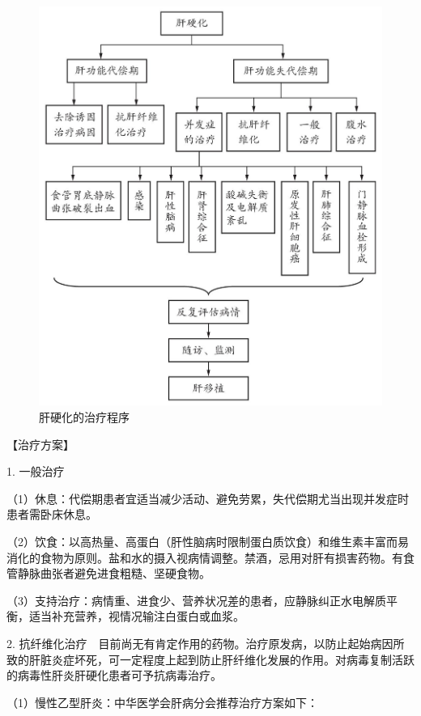 \begin{figure}[!htbp]
 \centering
 \includegraphics{./images/Image00104.jpg}
 \captionsetup{justification=centering}
 \caption{肝硬化的治疗程序}
 \label{fig3-15-1}
  \end{figure} 

【治疗方案】

1. 一般治疗

（1）休息：代偿期患者宜适当减少活动、避免劳累，失代偿期尤当出现并发症时患者需卧床休息。

（2）饮食：以高热量、高蛋白（肝性脑病时限制蛋白质饮食）和维生素丰富而易消化的食物为原则。盐和水的摄入视病情调整。禁酒，忌用对肝有损害药物。有食管静脉曲张者避免进食粗糙、坚硬食物。

（3）支持治疗：病情重、进食少、营养状况差的患者，应静脉纠正水电解质平衡，适当补充营养，视情况输注白蛋白或血浆。

2.
抗纤维化治疗　目前尚无有肯定作用的药物。治疗原发病，以防止起始病因所致的肝脏炎症坏死，可一定程度上起到防止肝纤维化发展的作用。对病毒复制活跃的病毒性肝炎肝硬化患者可予抗病毒治疗。

（1）慢性乙型肝炎：中华医学会肝病分会推荐治疗方案如下：

